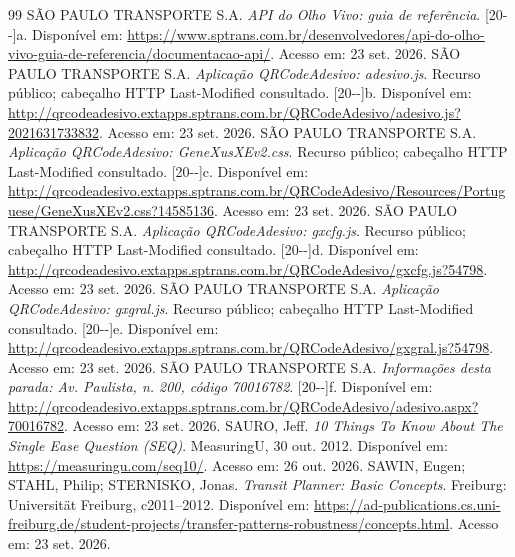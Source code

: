 \documentclass[12pt,oneside,a4paper,brazil,chapter=TITLE]{abntex2}
\begin{document}
\begin{thebibliography}{99}
 SÃO PAULO TRANSPORTE S.A. \textit{API do Olho Vivo: guia de referência}. [20\mbox{-}\mbox{-}]a. Disponível em: \url{https://www.sptrans.com.br/desenvolvedores/api-do-olho-vivo-guia-de-referencia/documentacao-api/}. Acesso em: 23 set. 2026.
 SÃO PAULO TRANSPORTE S.A. \textit{Aplicação QRCodeAdesivo: adesivo.js}. Recurso público; cabeçalho HTTP Last-Modified consultado. [20\mbox{-}\mbox{-}]b. Disponível em: \url{http://qrcodeadesivo.extapps.sptrans.com.br/QRCodeAdesivo/adesivo.js?2021631733832}. Acesso em: 23 set. 2026.
 SÃO PAULO TRANSPORTE S.A. \textit{Aplicação QRCodeAdesivo: GeneXusXEv2.css}. Recurso público; cabeçalho HTTP Last-Modified consultado. [20\mbox{-}\mbox{-}]c. Disponível em: \url{http://qrcodeadesivo.extapps.sptrans.com.br/QRCodeAdesivo/Resources/Portuguese/GeneXusXEv2.css?14585136}. Acesso em: 23 set. 2026.
 SÃO PAULO TRANSPORTE S.A. \textit{Aplicação QRCodeAdesivo: gxcfg.js}. Recurso público; cabeçalho HTTP Last-Modified consultado. [20\mbox{-}\mbox{-}]d. Disponível em: \url{http://qrcodeadesivo.extapps.sptrans.com.br/QRCodeAdesivo/gxcfg.js?54798}. Acesso em: 23 set. 2026.
 SÃO PAULO TRANSPORTE S.A. \textit{Aplicação QRCodeAdesivo: gxgral.js}. Recurso público; cabeçalho HTTP Last-Modified consultado. [20\mbox{-}\mbox{-}]e. Disponível em: \url{http://qrcodeadesivo.extapps.sptrans.com.br/QRCodeAdesivo/gxgral.js?54798}. Acesso em: 23 set. 2026.
 SÃO PAULO TRANSPORTE S.A. \textit{Informações desta parada: Av. Paulista, n. 200, código 70016782}. [20\mbox{-}\mbox{-}]f. Disponível em: \url{http://qrcodeadesivo.extapps.sptrans.com.br/QRCodeAdesivo/adesivo.aspx?70016782}. Acesso em: 23 set. 2026.
 SAURO, Jeff. \textit{10 Things To Know About The Single Ease Question (SEQ)}. MeasuringU, 30 out. 2012. Disponível em: \url{https://measuringu.com/seq10/}. Acesso em: 26 out. 2026.
 SAWIN, Eugen; STAHL, Philip; STERNISKO, Jonas. \textit{Transit Planner: Basic Concepts}. Freiburg: Universität Freiburg, c2011--2012. Disponível em: \url{https://ad-publications.cs.uni-freiburg.de/student-projects/transfer-patterns-robustness/concepts.html}. Acesso em: 23 set. 2026.

\end{thebibliography}
\end{document}
